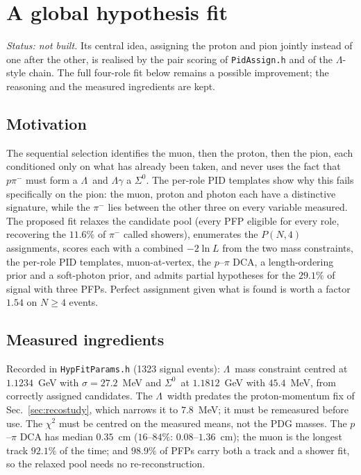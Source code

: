 \documentclass[11pt,a4paper]{article}
\newcommand{\Szero}{\ensuremath{\Sigma^{0}}}
\newcommand{\Lam}{\ensuremath{\Lambda}}
\begin{document}
\section{A global hypothesis fit}
\label{sec:hypfit}

\emph{Status: not built.} Its central idea, assigning the proton and pion jointly
instead of one after the other, is realised by the pair scoring of \texttt{PidAssign.h}
and of the \Lam-style chain. The full four-role fit below remains a possible
improvement; the reasoning and the measured ingredients are kept.

\subsection{Motivation}

The sequential selection identifies the muon, then the proton, then the pion, each
conditioned only on what has already been taken, and never uses the fact that
$p\pi^-$ must form a \Lam\ and $\Lam\gamma$ a \Szero. The per-role PID templates show
why this fails specifically on the pion: the muon, proton and photon each have a
distinctive signature, while the $\pi^-$ lies between the other three on every variable
measured. The proposed fit relaxes the candidate pool (every PFP eligible for every
role, recovering the $11.6\%$ of $\pi^-$ called showers), enumerates the $P(N,4)$
assignments, scores each with a combined $-2\ln L$ from the two mass constraints, the
per-role PID templates, muon-at-vertex, the $p$--$\pi$ DCA, a length-ordering prior and
a soft-photon prior, and admits partial hypotheses for the $29.1\%$ of signal with three
PFPs. Perfect assignment given what is found is worth a factor $1.54$ on $N\geq4$
events.

\subsection{Measured ingredients}

Recorded in \texttt{HypFitParams.h} (1323 signal events): \Lam\ mass constraint
centred at $1.1234$~GeV with $\sigma=27.2$~MeV and \Szero\ at $1.1812$~GeV with
$45.4$~MeV, from correctly assigned candidates. The \Lam\ width predates the
proton-momentum fix of Sec.~\ref{sec:recostudy}, which narrows it to $7.8$~MeV; it
must be remeasured before use. The $\chi^2$ must be centred on the measured means,
not the PDG masses. The $p$--$\pi$ DCA has median $0.35$~cm ($16$--$84\%$:
$0.08$--$1.36$~cm); the muon is the longest track $92.1\%$ of the time; and $98.9\%$
of PFPs carry both a track and a shower fit, so the relaxed pool needs no
re-reconstruction.
\end{document}
